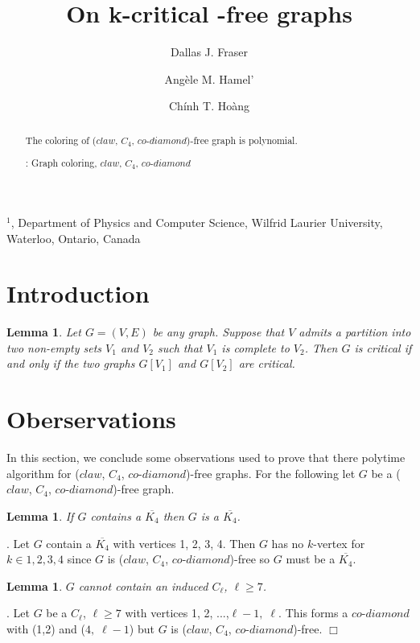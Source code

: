 \documentclass[12pt]{article}
\title{On k-critical {\CCD}-free graphs}
\author{
	Dallas J. Fraser\inst{1}
	\and Ang\`ele M. Hamel'\inst{1}
	\and Ch\'inh T. Ho\`ang\inst{1}
}
\newtheorem{Lemma}[Theorem]{Lemma}
\def\inst#1{$^{#1}$}
\def\CCD{($claw$, $C_4$, $co$-$diamond$)}
\begin{document}
\maketitle

\begin{center}
{\footnotesize

\inst{1}, Department of Physics and Computer Science, Wilfrid Laurier
University, \\Waterloo, Ontario, Canada}

\end{center}

\begin{abstract}
The coloring of {\CCD}-free graph is polynomial.

: Graph coloring, $claw$, $C_4$, $co$-$diamond$
\end{abstract}


\section{Introduction}\label{sec:intro}

\begin{Lemma}\label{lem:join-critical}
Let $G=(V,E)$ be any graph.  Suppose that $V$ admits a partition into
two non-empty sets $V_1$ and $V_2$ such that $V_1$ is complete to
$V_2$.  Then $G$ is critical if and only if the two graphs $G[V_1]$
and $G[V_2]$ are critical.
\end{Lemma}

\section{Oberservations}\label{sec:observations}
In this section, we conclude some observations used to prove that there polytime algorithm for {\CCD}-free graphs. For the following let $G$ be a {\CCD}-free graph.

\begin{Lemma}\label{lem:cok4-reduce-codiamond}
If $G$ contains a $\overline{K_4}$ then $G$ is a $\overline{K_4}$.
\end{Lemma}
. Let $G$ contain a $\overline{K_4}$ with vertices 1, 2, 3, 4. Then $G$ has no $k$-vertex for $k \in {1,2,3,4}$ since $G$ is {\CCD}-free so $G$ must be a $\overline{K_4}$. 

\begin{Lemma}\label{lem:odd-hole-free}
$G$ cannot contain an induced $C_\ell$, $\ell \geq 7$.
\end{Lemma}
. Let $G$ be a $C_\ell$, $\ell \geq 7$ with vertices 1, 2, ...,$\ell - 1,\; \ell$. This forms a $co$-$diamond$ with (1,2) and ($4,\; \ell - 1$) but $G$ is {\CCD}-free. $\Box$
\end{document}
